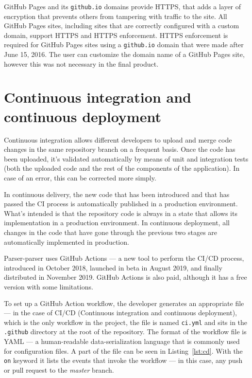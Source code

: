 \documentclass[english,bachelors,forcepolishlogotype]{wizthesis}
\newcommand{\thisproject}{Parser-parser}
\begin{document}
GitHub Pages and its \texttt{github.io} domains provide HTTPS, that adds a layer
of encryption that prevents others from tampering with traffic to the site. All
GitHub Pages sites, including sites that are correctly configured with a custom
domain, support HTTPS and HTTPS enforcement. HTTPS enforcement is required for
GitHub Pages sites using a \texttt{github.io} domain that were made after June
15, 2016. The user can customize the domain name of a GitHub Pages site, however
this was not necessary in the final product.

\section{Continuous integration and continuous deployment}

Continuous integration allows different developers to upload and merge code
changes in the same repository branch on a frequent basis. Once the code has
been uploaded, it's validated automatically by means of unit and integration
tests (both the uploaded code and the rest of the components of the
application). In case of an error, this can be corrected more simply.

In continuous delivery, the new code that has been introduced and that has
passed the CI process is automatically published in a production environment.
What's intended is that the repository code is always in a state that allows its
implementation in a production environment. In continuous deployment, all
changes in the code that have gone through the previous two stages are
automatically implemented in production.

\thisproject{} uses GitHub Actions --- a new tool to perform the CI/CD process,
introduced in October 2018, launched in beta in August 2019, and finally
distributed in November 2019. GitHub Actions is also paid, although it has a
free version with some limitations.

To set up a GitHub Action workflow, the developer generates an appropriate file
--- in the case of CI/CD (Continuous integration and continuous deployment),
which is the only workflow in the project, the file is named \texttt{ci.yml} and
sits in the \texttt{.github} directory at the root of the repository. The format
of the workflow file is YAML --- a human-readable data-serialization language
that is commonly used for configuration files. A part of the file can be seen in
Listing~\ref{lst:cd}. With the \texttt{on} keyword it lists the events that
invoke the workflow --- in this case, any push or pull request to the
\emph{master} branch.
\end{document}
